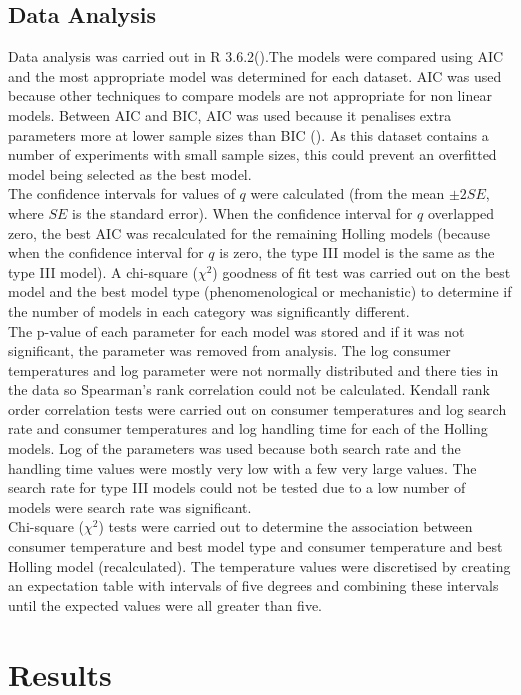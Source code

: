 \documentclass{article}
\begin{document}
\subsection{Data Analysis}
Data analysis was carried out in R 3.6.2(\cite{RCoreTeam2017}).The models were compared using AIC and the most appropriate model was determined for each dataset. AIC was used because other techniques to compare models are not appropriate for non linear models. Between AIC and BIC, AIC was used because it penalises extra parameters more at lower sample sizes than BIC (\cite{Johnson2004ModelEvolution}). As this dataset contains  a number of experiments with small sample sizes, this could prevent an overfitted model being selected as the best model.\\ 
The confidence intervals for values of $q$ were calculated (from the mean $\pm2SE$, where $SE$ is the standard error). When the confidence interval for $q$ overlapped zero, the best AIC was recalculated for the remaining Holling models (because when the confidence interval for $q$ is zero, the type III model is the same as the type III model).
A chi-square ($\chi^2$) goodness of fit test was carried out on the best model and the best model type (phenomenological or mechanistic) to determine if the number of models in each category was significantly different.\\
The p-value of each parameter for each model was stored and if it was not significant, the parameter was removed from analysis. The log consumer temperatures and log parameter were not normally distributed and there ties in the data so Spearman's rank correlation could not be calculated.  Kendall rank order correlation tests were carried out on consumer temperatures and log search rate and consumer temperatures and log handling time for each of the Holling models. Log of the parameters was used because both search rate and the handling time values were mostly very low with  a few very large values. The search rate for type III models could not be tested due to a low number of models were search rate was significant. \\ 
Chi-square ($\chi^2$) tests were carried out to determine the association between consumer temperature and best model type and consumer temperature and best Holling model (recalculated). The temperature values were discretised by creating an expectation table with intervals of five degrees and combining these intervals until the expected values were all greater than five.
\section{Results}
\end{document}
